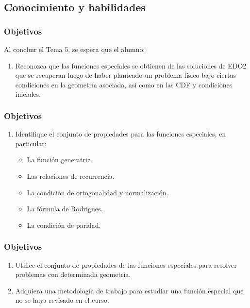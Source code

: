 \documentclass[12pt]{beamer}
\begin{document}
\subsection{Conocimiento y habilidades}

\begin{frame}
\frametitle{Objetivos}
Al concluir el Tema 5, se espera que el alumno:
\begin{enumerate}[<+->]
\item Reconozca que las funciones especiales se obtienen de las soluciones de EDO2 que se recuperan luego de haber planteado un problema físico bajo ciertas condiciones en la geometría asociada, así como en las CDF y condiciones iniciales.                            
\seti
\end{enumerate}
\end{frame}
\begin{frame}
\frametitle{Objetivos}
\begin{enumerate}[<+->]
\conti
\item Identifique el conjunto de propiedades para las funciones especiales, en particular:
\begin{itemize}
\item La función generatriz.
\item Las relaciones de recurrencia.
\item La condición de ortogonalidad y normalización.
\item La fórmula de Rodrigues.
\item La condición de paridad.
\end{itemize}
\seti
\end{enumerate}
\end{frame}
\begin{frame}
\frametitle{Objetivos}
\begin{enumerate}[<+->]
\conti
\item Utilice el conjunto de propiedades de las funciones especiales para resolver problemas con determinada geometría.
\item Adquiera una metodología de trabajo para estudiar una función especial que no se haya revisado en el curso.
\end{enumerate}
\end{frame}
\end{document}
